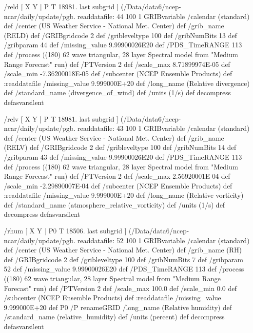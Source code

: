 \begin{ingrid}
  /reld { [ X Y | P T 18981. last subgrid ] (/Data/data6/ncep-ncar/daily/update/pgb.%
  readdatafile:
  44 100 1 GRIBvariable
  /calendar (standard) def
  /center (US Weather Service - National Met. Center) def
  /grib_name (RELD) def
  /GRIBgridcode 2 def
  /gribleveltype 100 def
  /gribNumBits 13 def
  /gribparam 44 def
  /missing_value 9.99900026E20 def
  /PDS_TimeRANGE 113 def
  /process ((180) 62 wave triangular, 28 layer Spectral model from "Medium Range Forecast" run) def
  /PTVersion 2 def
  /scale_max 8.71899974E-05 def
  /scale_min -7.36200018E-05 def
  /subcenter (NCEP Ensemble Products) def
  :readdatafile
  /missing_value 9.999000E+20 def
  /long_name (Relative divergence) def
  /standard_name (divergence_of_wind) def
  /units (1/s) def
  decompress
  } defasvarsilent

  /relv { [ X Y | P T 18981. last subgrid ] (/Data/data6/ncep-ncar/daily/update/pgb.%
  readdatafile:
  43 100 1 GRIBvariable
  /calendar (standard) def
  /center (US Weather Service - National Met. Center) def
  /grib_name (RELV) def
  /GRIBgridcode 2 def
  /gribleveltype 100 def
  /gribNumBits 14 def
  /gribparam 43 def
  /missing_value 9.99900026E20 def
  /PDS_TimeRANGE 113 def
  /process ((180) 62 wave triangular, 28 layer Spectral model from "Medium Range Forecast" run) def
  /PTVersion 2 def
  /scale_max 2.56920001E-04 def
  /scale_min -2.29890007E-04 def
  /subcenter (NCEP Ensemble Products) def
  :readdatafile
  /missing_value 9.999000E+20 def
  /long_name (Relative vorticity) def
  /standard_name (atmosphere_relative_vorticity) def
  /units (1/s) def
  decompress
  } defasvarsilent

  /rhum { [ X Y | P0 T 18506. last subgrid ] (/Data/data6/ncep-ncar/daily/update/pgb.%
  readdatafile:
  52 100 1 GRIBvariable
  /calendar (standard) def
  /center (US Weather Service - National Met. Center) def
  /grib_name (RH) def
  /GRIBgridcode 2 def
  /gribleveltype 100 def
  /gribNumBits 7 def
  /gribparam 52 def
  /missing_value 9.99900026E20 def
  /PDS_TimeRANGE 113 def
  /process ((180) 62 wave triangular, 28 layer Spectral model from "Medium Range Forecast" run) def
  /PTVersion 2 def
  /scale_max 100.0 def
  /scale_min 0.0 def
  /subcenter (NCEP Ensemble Products) def
  :readdatafile
  /missing_value 9.999000E+20 def
  P0 /P renameGRID
  /long_name (Relative humidity) def
  /standard_name (relative_humidity) def
  /units (percent) def
  decompress
  } defasvarsilent


\end{ingrid}
